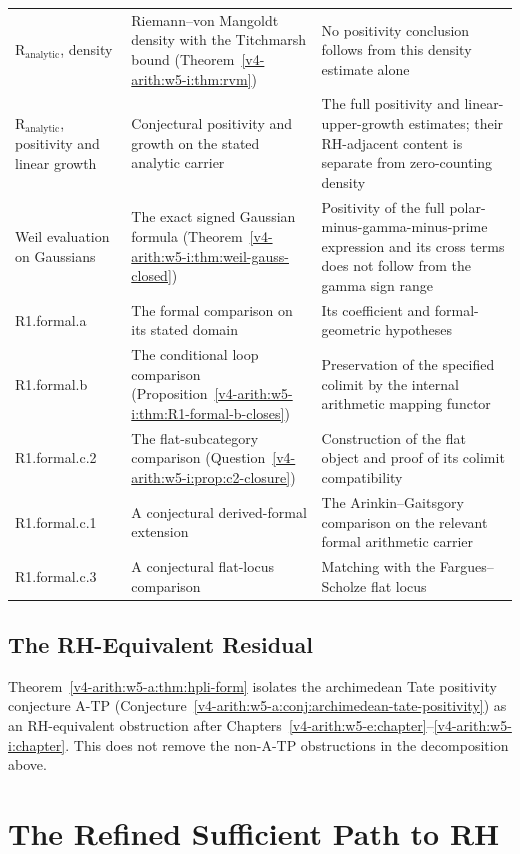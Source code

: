 \begin{longtable}{@{}p{}|p{}|p{}@{}}
\(\mathrm R_{\mathrm{analytic}}\), density & Riemann--von Mangoldt
density with the Titchmarsh bound
(Theorem~\ref{v4-arith:w5-i:thm:rvm}) & No positivity conclusion follows
from this density estimate alone \\
\(\mathrm R_{\mathrm{analytic}}\), positivity and linear growth &
Conjectural positivity and growth on the stated analytic carrier &
The full positivity and linear-upper-growth estimates; their
RH-adjacent content is separate from zero-counting density \\
Weil evaluation on Gaussians & The exact signed Gaussian formula
(Theorem~\ref{v4-arith:w5-i:thm:weil-gauss-closed}) & Positivity of the full
polar-minus-gamma-minus-prime expression and its cross terms does not
follow from the gamma sign range \\
R1.formal.a & The formal comparison on its stated domain & Its
coefficient and formal-geometric hypotheses \\
R1.formal.b & The conditional loop comparison
(Proposition~\ref{v4-arith:w5-i:thm:R1-formal-b-closes}) & Preservation
of the specified colimit by the internal arithmetic mapping functor \\
R1.formal.c.2 & The flat-subcategory comparison
(Question~\ref{v4-arith:w5-i:prop:c2-closure}) & Construction of the
flat object and proof of its colimit compatibility \\
R1.formal.c.1 & A conjectural derived-formal extension & The
Arinkin--Gaitsgory comparison on the relevant formal arithmetic
carrier \\
R1.formal.c.3 & A conjectural flat-locus comparison & Matching with
the Fargues--Scholze flat locus \\
\end{longtable}
\endgroup

\subsection{The RH-Equivalent Residual}
\label{v4-arith:w5-synth:crown-jewel}

Theorem~\ref{v4-arith:w5-a:thm:hpli-form} isolates the archimedean Tate
positivity conjecture A-TP
(Conjecture~\ref{v4-arith:w5-a:conj:archimedean-tate-positivity}) as an
RH-equivalent obstruction after Chapters~\ref{v4-arith:w5-e:chapter}--\ref{v4-arith:w5-i:chapter}. This does not remove
the non-A-TP obstructions in the decomposition above.

\section{The Refined Sufficient Path to RH}
\label{v4-arith:w5-synth:refined-sufficient-path}

